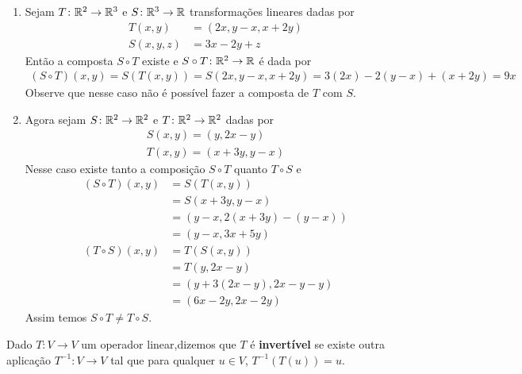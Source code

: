 \begin{exemplos}
    \begin{enumerate}
        \item Sejam $T \colon \mathbb{R}^2 \to \mathbb{R}^3$ e $S \colon \mathbb{R}^3 \to \mathbb{R}$ transformações lineares dadas por
        \begin{align*}
            T(x, y) &= (2x, y - x, x + 2y)\\
            S(x, y, z) &= 3x - 2y + z
        \end{align*}
        Então a composta $S \circ T$ existe e $S \circ T \colon \mathbb{R}^2 \to \mathbb{R}$ é dada por
        \begin{align*}
            (S \circ T)(x, y) = S(T(x, y)) = S(2x, y - x, x + 2y) = 3(2x) - 2(y - x) + (x + 2y) = 9x
        \end{align*}
        Observe que nesse caso não é possível fazer a composta de $T$ com $S$.

        \item Agora sejam $S \colon \mathbb{R}^2 \to \mathbb{R}^2$ e $T \colon \mathbb{R}^2 \to \mathbb{R}^2$ dadas por
        \begin{align*}
            S(x, y) = (y, 2x - y)\\
            T(x, y) = (x + 3y, y - x)
        \end{align*}
        Nesse caso existe tanto a composição $S \circ T$ quanto $T \circ S$ e
        \begin{align*}
            (S \circ T)(x, y) &= S(T(x, y)) \\ &= S(x + 3y, y - x) \\ &= (y - x, 2(x + 3y) - (y - x)) \\ &= (y - x, 3x + 5y)\\
            (T \circ S)(x, y) &= T(S(x, y)) \\ &= T(y, 2x - y) \\ &= (y + 3(2x - y), 2x - y - y) \\ &= (6x - 2y, 2x - 2y)
        \end{align*}
        Assim temos $S \circ T \ne T \circ S$.
    \end{enumerate}
\end{exemplos}

\begin{definicao}
    Dado $T \colon V \to V$ um operador linear,dizemos que $T$ é \textbf{invertível} se existe outra aplicação $T^{-1} \colon V \to V$ tal que para qualquer $u \in V$, $T^{-1}(T(u)) = u$.
\end{definicao}

